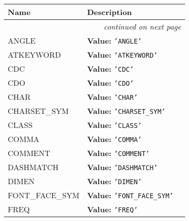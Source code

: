     \vspace{-1cm}
\hspace{\varindent}\begin{longtable}{|p{\varnamewidth}|p{\vardescrwidth}|l}
\cline{1-2}
\cline{1-2} \centering \textbf{Name} & \centering \textbf{Description}& \\
\cline{1-2}
\endhead\cline{1-2}\multicolumn{3}{r}{\small\textit{continued on next page}}\\\endfoot\cline{1-2}
\endlastfoot\raggedright A\-N\-G\-L\-E\- & \raggedright \textbf{Value:} 
{\tt \texttt{'}\texttt{ANGLE}\texttt{'}}&\\
\cline{1-2}
\raggedright A\-T\-K\-E\-Y\-W\-O\-R\-D\- & \raggedright \textbf{Value:} 
{\tt \texttt{'}\texttt{ATKEYWORD}\texttt{'}}&\\
\cline{1-2}
\raggedright C\-D\-C\- & \raggedright \textbf{Value:} 
{\tt \texttt{'}\texttt{CDC}\texttt{'}}&\\
\cline{1-2}
\raggedright C\-D\-O\- & \raggedright \textbf{Value:} 
{\tt \texttt{'}\texttt{CDO}\texttt{'}}&\\
\cline{1-2}
\raggedright C\-H\-A\-R\- & \raggedright \textbf{Value:} 
{\tt \texttt{'}\texttt{CHAR}\texttt{'}}&\\
\cline{1-2}
\raggedright C\-H\-A\-R\-S\-E\-T\-\_\-S\-Y\-M\- & \raggedright \textbf{Value:} 
{\tt \texttt{'}\texttt{CHARSET\_SYM}\texttt{'}}&\\
\cline{1-2}
\raggedright C\-L\-A\-S\-S\- & \raggedright \textbf{Value:} 
{\tt \texttt{'}\texttt{CLASS}\texttt{'}}&\\
\cline{1-2}
\raggedright C\-O\-M\-M\-A\- & \raggedright \textbf{Value:} 
{\tt \texttt{'}\texttt{COMMA}\texttt{'}}&\\
\cline{1-2}
\raggedright C\-O\-M\-M\-E\-N\-T\- & \raggedright \textbf{Value:} 
{\tt \texttt{'}\texttt{COMMENT}\texttt{'}}&\\
\cline{1-2}
\raggedright D\-A\-S\-H\-M\-A\-T\-C\-H\- & \raggedright \textbf{Value:} 
{\tt \texttt{'}\texttt{DASHMATCH}\texttt{'}}&\\
\cline{1-2}
\raggedright D\-I\-M\-E\-N\- & \raggedright \textbf{Value:} 
{\tt \texttt{'}\texttt{DIMEN}\texttt{'}}&\\
\cline{1-2}
\raggedright F\-O\-N\-T\-\_\-F\-A\-C\-E\-\_\-S\-Y\-M\- & \raggedright \textbf{Value:} 
{\tt \texttt{'}\texttt{FONT\_FACE\_SYM}\texttt{'}}&\\
\cline{1-2}
\raggedright F\-R\-E\-Q\- & \raggedright \textbf{Value:} 
{\tt \texttt{'}\texttt{FREQ}\texttt{'}}&\\

\end{longtable}
